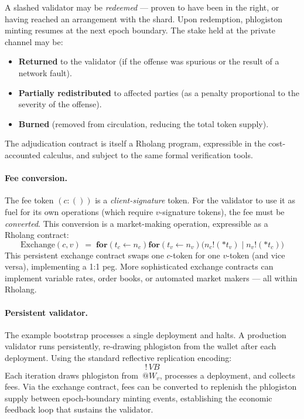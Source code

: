 \documentclass[11pt,a4paper]{article}
\makeatletter
\newcommand{\Par}{\mathbin{|}}
\newcommand{\forc}{\mathbf{for}}
\newcommand{\send}[2]{#1 !\!\left( #2 \right)}
\newcommand{\recv}[3]{\forc\!\left( #1 \leftarrow #2 \right) #3}
\newcommand{\drop}[1]{{\ast} #1}
\newcommand{\quot}[1]{@#1}
\makeatother
\begin{document}
A slashed validator may be \emph{redeemed} --- proven to
have been in the right, or having reached an arrangement
with the shard.  Upon redemption, phlogiston minting resumes
at the next epoch boundary.  The stake held at the private
channel may be:
\begin{itemize}[nosep]
  \item \textbf{Returned} to the validator (if the
    offense was spurious or the result of a network fault).
  \item \textbf{Partially redistributed} to affected parties
    (as a penalty proportional to the severity of the
    offense).
  \item \textbf{Burned} (removed from circulation, reducing
    the total token supply).
\end{itemize}
The adjudication contract is itself a Rholang program,
expressible in the cost-accounted calculus, and subject to
the same formal verification tools.

\paragraph{Fee conversion.}
The fee token $(c : ())$ is a \emph{client-signature}
token.  For the validator to use it as fuel for its own
operations (which require $v$-signature tokens), the fee
must be \emph{converted}.  This conversion is a
market-making operation, expressible as a Rholang contract:
\[
  \mathrm{Exchange}(c, v)
  \;=\;
  \recv{t_c}{n_c}{
    \recv{t_v}{n_v}{
      \bigl(
        \send{n_c}{\drop{t_v}}
        \Par
        \send{n_v}{\drop{t_c}}
      \bigr)
    }
  }
\]
This persistent exchange contract swaps one $c$-token for
one $v$-token (and vice versa), implementing a 1:1 peg.
More sophisticated exchange contracts can implement
variable rates, order books, or automated market makers ---
all within Rholang.

\paragraph{Persistent validator.}
The example bootstrap processes a single deployment and
halts.  A production validator runs persistently,
re-drawing phlogiston from the wallet after each
deployment.  Using the standard reflective replication
encoding:
\[
  !\, \mathit{VB}
\]
Each iteration draws phlogiston from~$\quot{W_v}$,
processes a deployment, and collects fees.  Via the exchange
contract, fees can be converted to replenish the
phlogiston supply between epoch-boundary minting events,
establishing the economic feedback loop that sustains the
validator.
\end{document}
